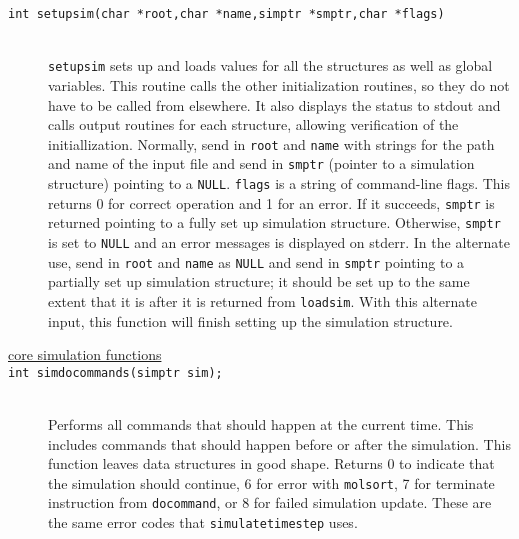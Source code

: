\documentclass {book}
\begin{document}
\begin{description}
\item[\texttt{int setupsim(char *root,char *name,simptr *smptr,char *flags)}]
\hfill \\
\texttt{setupsim} sets up and loads values for all the structures as well as global variables. This routine calls the other initialization routines, so they do not have to be called from elsewhere. It also displays the status to stdout and calls output routines for each structure, allowing verification of the initiallization. Normally, send in \texttt{root} and \texttt{name} with strings for the path and name of the input file and send in \texttt{smptr} (pointer to a simulation structure) pointing to a \texttt{NULL}. \texttt{flags} is a string of command-line flags. This returns 0 for correct operation and 1 for an error. If it succeeds, \texttt{smptr} is returned pointing to a fully set up simulation structure. Otherwise, \texttt{smptr} is set to \texttt{NULL} and an error messages is displayed on stderr. In the alternate use, send in \texttt{root} and \texttt{name} as \texttt{NULL} and send in \texttt{smptr} pointing to a partially set up simulation structure; it should be set up to the same extent that it is after it is returned from \texttt{loadsim}. With this alternate input, this function will finish setting up the simulation structure.

\item[\underline{core simulation functions}]

\item[\texttt{int simdocommands(simptr sim);}]
\hfill \\
Performs all commands that should happen at the current time. This includes commands that should happen before or after the simulation. This function leaves data structures in good shape. Returns 0 to indicate that the simulation should continue, 6 for error with \texttt{molsort}, 7 for terminate instruction from \texttt{docommand}, or 8 for failed simulation update. These are the same error codes that \texttt{simulatetimestep} uses.


\end{description}
\end{document}
